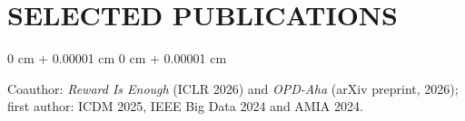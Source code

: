 \documentclass[10pt, letterpaper]{article}
\newenvironment{onecolentry}{
    \begin{adjustwidth}{
        0 cm + 0.00001 cm
    }{
        0 cm + 0.00001 cm
    }
}{
    \end{adjustwidth}
} %
\begin{document}
\section{SELECTED PUBLICATIONS}
\begin{onecolentry}
Coauthor: \textit{Reward Is Enough} (ICLR 2026) and \textit{OPD-Aha} (arXiv preprint, 2026); first author: ICDM 2025, IEEE Big Data 2024 and AMIA 2024.
\end{onecolentry}
\end{document}
